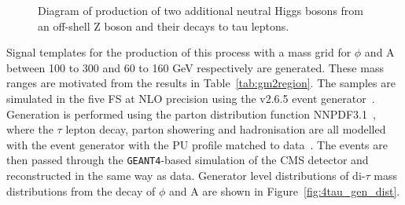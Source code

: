\begin{figure}[H]
\centering
{}
\vspace*{10mm}
\caption{Diagram of production of two additional neutral Higgs bosons from an off-shell Z boson and their decays to tau leptons.}
\label{fig:4tau_feynamn}
\end{figure}

Signal templates for the production of this process with a mass grid for $\phi$ and A between 100 to 300 and 60 to 160 GeV respectively are generated.
These mass ranges are motivated from the results in Table~\ref{tab:gm2region}.
The samples are simulated in the five \ac{FS} at \ac{NLO} precision using the \MGvATNLO v2.6.5 event generator~\cite{Alwall:2011uj}.
Generation is performed using the parton distribution function NNPDF3.1~\cite{Ball:2014uwa,Ball:2017nwa}, where the $\tau$ lepton decay, parton showering and hadronisation are all modelled with the \PYTHIA event generator with the \ac{PU} profile matched to data~\cite{Sirunyan:2019dfx,Sjostrand:2014zea}.
The events are then passed through the \texttt{GEANT4}-based \cite{Agostinelli:2002hh} simulation of the \ac{CMS} detector and reconstructed in the same way as data.
Generator level distributions of di-$\tau$ mass distributions from the decay of $\phi$ and A are shown in Figure~\ref{fig:4tau_gen_dist}.\\

